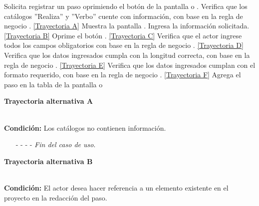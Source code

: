 	\begin{UCtrayectoria}
		\UCpaso[\UCactor] Solicita registrar un paso oprimiendo el botón  de la pantalla  o .
		\UCpaso[\UCsist] Verifica que los catálogos ''Realiza'' y ''Verbo'' cuente con información, con base en la regla de negocio . \hyperlink{CU12-1-1-1-1:TAA}{[Trayectoria A]}
		\UCpaso[\UCsist] Muestra la pantalla .
		\UCpaso[\UCactor] Ingresa la información solicitada. \hyperlink{CU12-1-1-1-1:TAB}{[Trayectoria B]} \label{CU12.1.1.1.1-P5}
		\UCpaso[\UCactor] Oprime el botón . \label{CU12.1.1.1.1-P6} \hyperlink{CU12-1-1-1-1:TAC}{[Trayectoria C]} 
		\UCpaso[\UCsist] Verifica que el actor ingrese todos los campos obligatorios con base en la regla de negocio . \hyperlink{CU12-1-1-1-1:TAD}{[Trayectoria D]}
		\UCpaso[\UCsist] Verifica que los datos ingresados cumpla con la longitud correcta, con base en la regla de negocio . \hyperlink{CU12-1-1-1-1:TAE}{[Trayectoria E]}
		\UCpaso[\UCsist] Verifica que los datos ingresados cumplan con el formato requerido, con base en la regla de negocio . \hyperlink{CU12-1-1-1-1:TAF}{[Trayectoria F]}
		\UCpaso[\UCsist] Agrega el paso en la tabla de la pantalla  o 
	\end{UCtrayectoria}		
\hypertarget{CU12-1-1-1-1:TAA}{\textbf{Trayectoria alternativa A}}\\
\noindent \textbf{Condición:} Los catálogos no contienen información.
\begin{enumerate}
	\UCpaso[\UCsist] Muestra el mensaje  en la pantalla  o  para indicar que no es posible realizar la operación debido a la falta de información necesaria para el sistema.
	\item[- -] - - {\em {Fin del caso de uso}}.%
\end{enumerate}
\hypertarget{CU12-1-1-1-1:TAB}{\textbf{Trayectoria alternativa B}}\\
\noindent \textbf{Condición:} El actor desea hacer referencia a un elemento existente en el proyecto en la redacción del paso.
